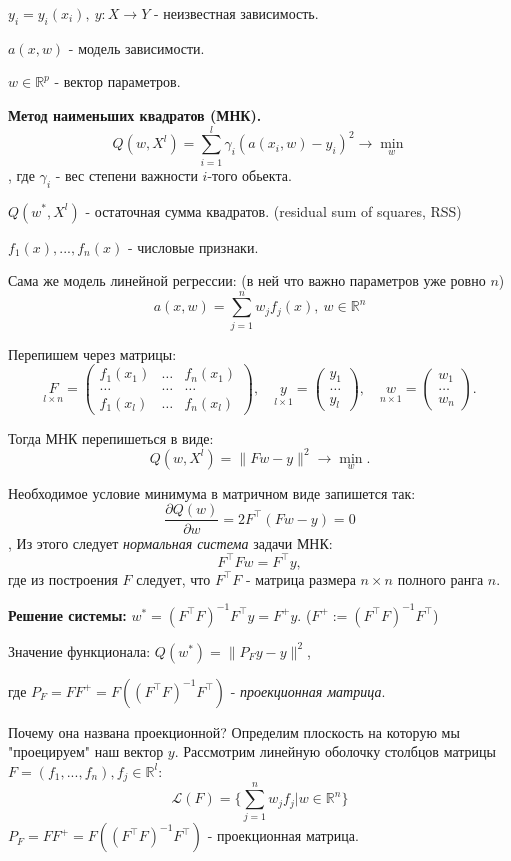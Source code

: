 $y_i = y_i(x_i), \ y: X \rightarrow Y$ - неизвестная зависимость.

$a(x, w)$ - модель зависимости.

$w \in \mathbb{R}^p$ - вектор параметров.
 
\noindent\textbf{Метод наименьших квадратов (МНК).} 
$$Q(w, X^l) = \sum_{i = 1}^l \gamma_i(a(x_i, w) - y_i)^2 \rightarrow \min_w$$,
где $\gamma_i$ - вес степени важности $i$-того обьекта.

$Q(w^*, X^l)$ - остаточная сумма квадратов. (residual sum of squares, RSS)

$f_1(x), ..., f_n(x)$ - числовые признаки.

Сама же модель линейной регрессии: (в ней что важно параметров уже ровно $n$)
$$a(x, w) = \sum_{j = 1}^nw_jf_j(x), \ w \in \mathbb{R}^n$$

Перепишем через матрицы:
$$\underset{l \times n}{F} = \begin{pmatrix}
    f_1(x_1) & \dots & f_n(x_1) \\
    \dots & \dots & \dots \\
    f_1(x_l) & \dots & f_n(x_l)
\end{pmatrix}, \quad \underset{l \times 1}{y} = \begin{pmatrix}
    y_1 \\
    \dots \\
    y_l
\end{pmatrix}, \quad \underset{n \times 1}{w} = \begin{pmatrix}
    w_1 \\
    \dots \\
    w_n
\end{pmatrix}.$$

Тогда МНК перепишеться в виде:
$$Q(w, X^l) = \|Fw - y\|^2 \rightarrow \min_w.$$

Необходимое условие минимума в матричном виде запишется так:
$$\frac{\partial Q(w)}{\partial w} = 2 F^\top (Fw - y) = 0$$,
Из этого следует \textit{нормальная система} задачи МНК:
$$F^\top Fw = F^\top y,$$
где из построения $F$ следует, что $F^\top F$ - матрица размера $n \times n$ полного ранга $n$.

\noindent\textbf{Решение системы:} $w^* = (F^\top F)^{-1}F^\top y = F^+ y$.
($F^+ := (F^\top F)^{-1}F^\top$)

Значение функционала: $Q(w^*) = \|P_Fy - y\|^2$,

где $P_F = FF^+ = F((F^\top F)^{-1}F^\top)$ - \textit{проекционная матрица}.

Почему она названа проекционной? Определим плоскость на которую мы "проецируем" наш вектор $y$.
Рассмотрим линейную оболочку столбцов матрицы $F = (f_1, ..., f_n), f_j \in \mathbb{R}^l$:
$$\mathcal{L}(F) = \{ \sum_{j = 1}^n w_jf_j| w \in \mathbb{R}^n\}$$
$P_F = FF^+ = F((F^\top F)^{-1}F^\top)$ - проекционная матрица.

